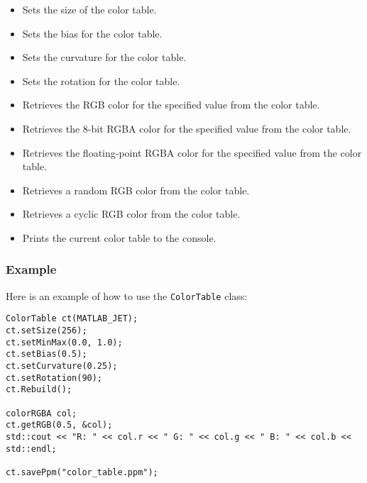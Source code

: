 \documentclass[a4paper,onecolumn,11pt]{doofus}
\begin{document}
\begin{itemize}
\item {}
Sets the size of the color table.

\item {}
Sets the bias for the color table.

\item {}
Sets the curvature for the color table.

\item {}
Sets the rotation for the color table.

\item {}
Retrieves the RGB color for the specified value from the color table.

\item {}
Retrieves the 8-bit RGBA color for the specified value from the color table.

\item {}
Retrieves the floating-point RGBA color for the specified value from the color table.

\item {}
Retrieves a random RGB color from the color table.

\item {}
Retrieves a cyclic RGB color from the color table.

\item {}
Prints the current color table to the console.
\end{itemize}

\subsubsection*{Example}

Here is an example of how to use the \texttt{ColorTable} class:

% 
\begin{lstlisting}[style=cppstyle]
ColorTable ct(MATLAB_JET);
ct.setSize(256);
ct.setMinMax(0.0, 1.0);
ct.setBias(0.5);
ct.setCurvature(0.25);
ct.setRotation(90);
ct.Rebuild();

colorRGBA col;
ct.getRGB(0.5, &col);
std::cout << "R: " << col.r << " G: " << col.g << " B: " << col.b << std::endl;

ct.savePpm("color_table.ppm");
\end{lstlisting}
\end{document}
